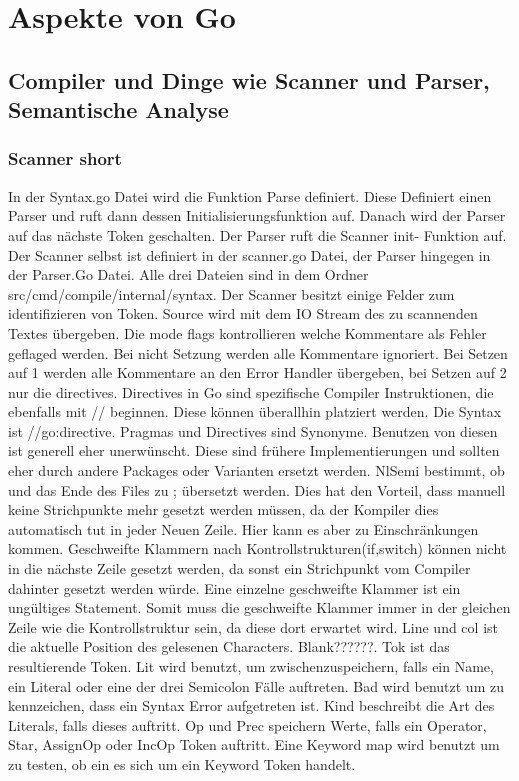 \chapter{Aspekte von Go}\label{ch:method}

\section{Compiler und Dinge wie Scanner und Parser, Semantische Analyse}
\subsection{Scanner short}
In der Syntax.go Datei wird die Funktion Parse definiert. Diese Definiert einen Parser und ruft dann dessen Initialisierungsfunktion auf. Danach wird der Parser auf das nächste Token geschalten. 
Der Parser ruft die Scanner init- Funktion auf. Der Scanner selbst ist definiert in der scanner.go Datei, der Parser hingegen in der Parser.Go Datei. Alle drei Dateien sind in dem Ordner src/cmd/compile/internal/syntax. 
Der Scanner besitzt einige Felder zum identifizieren von Token. 
Source wird mit dem IO Stream des zu scannenden Textes übergeben.
Die mode flags kontrollieren welche Kommentare als Fehler geflaged werden. 
Bei nicht Setzung werden alle Kommentare ignoriert. Bei Setzen auf 1 werden alle Kommentare an den Error Handler übergeben, bei Setzen auf 2 nur die directives. Directives in Go sind spezifische Compiler Instruktionen, die ebenfalls mit // beginnen. Diese können überallhin platziert werden. Die Syntax ist //go:directive. Pragmas und Directives sind Synonyme. Benutzen von diesen ist generell eher unerwünscht. Diese sind frühere Implementierungen und sollten eher durch andere Packages oder Varianten ersetzt werden.
NlSemi bestimmt, ob  und das Ende des Files zu ; übersetzt werden. Dies hat den Vorteil, dass manuell keine Strichpunkte mehr gesetzt werden müssen, da der Kompiler dies automatisch tut in jeder Neuen Zeile. Hier kann es aber zu Einschränkungen kommen. Geschweifte Klammern nach Kontrollstrukturen(if,switch) können nicht in die nächste Zeile gesetzt werden, da sonst ein Strichpunkt vom Compiler dahinter gesetzt werden würde. Eine einzelne geschweifte Klammer ist ein ungültiges Statement. Somit muss die geschweifte Klammer immer in der gleichen Zeile wie die Kontrollstruktur sein, da diese dort erwartet wird. 
Line und col ist die aktuelle Position des gelesenen Characters. Blank??????. Tok ist das resultierende Token. Lit wird benutzt, um zwischenzuspeichern, falls ein Name, ein Literal oder eine der drei Semicolon Fälle auftreten. Bad wird benutzt um zu kennzeichen, dass ein Syntax Error aufgetreten ist. Kind beschreibt die Art des Literals, falls dieses auftritt. Op und Prec speichern Werte, falls ein Operator, Star, AssignOp oder IncOp Token auftritt.
Eine Keyword map wird benutzt um zu testen, ob ein es sich um ein Keyword Token handelt.

